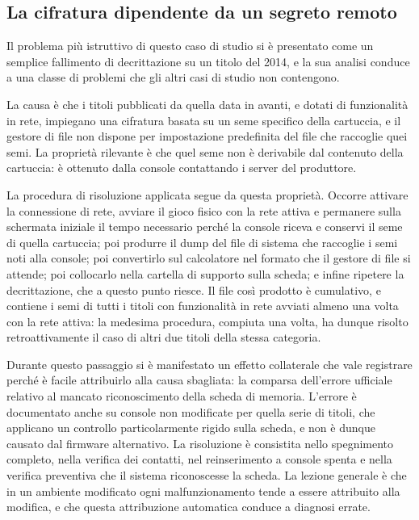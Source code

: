 \subsection{La cifratura dipendente da un segreto remoto}

Il problema più istruttivo di questo caso di studio si è presentato come un semplice fallimento di decrittazione su un titolo del 2014, e la sua analisi conduce a una classe di problemi che gli altri casi di studio non contengono.

La causa è che i titoli pubblicati da quella data in avanti, e dotati di funzionalità in rete, impiegano una cifratura basata su un seme specifico della cartuccia, e il gestore di file non dispone per impostazione predefinita del file che raccoglie quei semi. La proprietà rilevante è che quel seme non è derivabile dal contenuto della cartuccia: è ottenuto dalla console contattando i server del produttore.

La procedura di risoluzione applicata segue da questa proprietà. Occorre attivare la connessione di rete, avviare il gioco fisico con la rete attiva e permanere sulla schermata iniziale il tempo necessario perché la console riceva e conservi il seme di quella cartuccia; poi produrre il dump del file di sistema che raccoglie i semi noti alla console; poi convertirlo sul calcolatore nel formato che il gestore di file si attende; poi collocarlo nella cartella di supporto sulla scheda; e infine ripetere la decrittazione, che a questo punto riesce. Il file così prodotto è cumulativo, e contiene i semi di tutti i titoli con funzionalità in rete avviati almeno una volta con la rete attiva: la medesima procedura, compiuta una volta, ha dunque risolto retroattivamente il caso di altri due titoli della stessa categoria.

Durante questo passaggio si è manifestato un effetto collaterale che vale registrare perché è facile attribuirlo alla causa sbagliata: la comparsa dell'errore ufficiale relativo al mancato riconoscimento della scheda di memoria. L'errore è documentato anche su console non modificate per quella serie di titoli, che applicano un controllo particolarmente rigido sulla scheda, e non è dunque causato dal firmware alternativo. La risoluzione è consistita nello spegnimento completo, nella verifica dei contatti, nel reinserimento a console spenta e nella verifica preventiva che il sistema riconoscesse la scheda. La lezione generale è che in un ambiente modificato ogni malfunzionamento tende a essere attribuito alla modifica, e che questa attribuzione automatica conduce a diagnosi errate.

